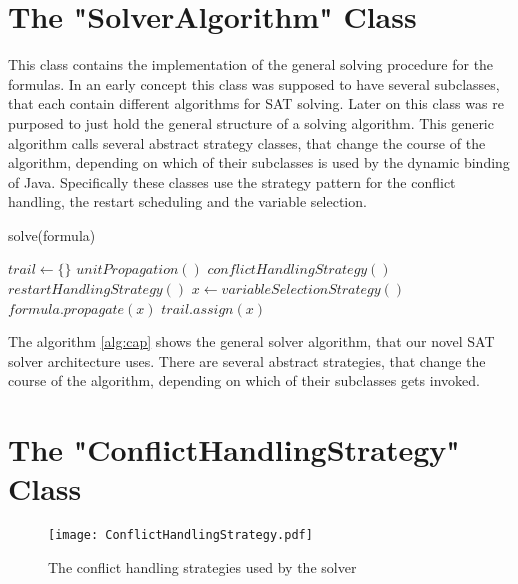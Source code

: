 \section{The "SolverAlgorithm" Class}

This class contains the implementation of the general solving procedure for the formulas. In an early concept this class was supposed to have several subclasses, that each contain different algorithms for SAT solving. Later on this class was re purposed to just hold the general structure of a solving algorithm. This generic algorithm calls several abstract strategy classes, that change the course of the algorithm, depending on which of their subclasses is used by the dynamic binding of Java. Specifically these classes use the strategy pattern for the conflict handling, the restart scheduling and the variable selection.

\begin{algorithm}
\caption{solve(formula)}\label{alg:cap}
\begin{algorithmic}
\State $trail \gets \{\}$
	\State $unitPropagation()$
	\State $conflictHandlingStrategy()$
	\State $restartHandlingStrategy()$
\Else
    \State $x \gets variableSelectionStrategy()$
    \State $formula.propagate(x)$
    \State $trail.assign(x)$
\EndIf
\EndWhile
\end{algorithmic}
\end{algorithm}

The algorithm \ref{alg:cap} shows the general solver algorithm, that our novel SAT solver architecture uses. There are several abstract strategies, that change the course of the algorithm, depending on which of their subclasses gets invoked.

\section{The "ConflictHandlingStrategy" Class}

\begin{figure}[htbp]
  \centering
  \texttt{[image: ConflictHandlingStrategy.pdf]}	
  \caption{The conflict handling strategies used by the solver}
  \label{fig:conflictHandling}
\end{figure}

